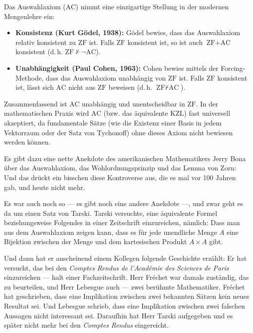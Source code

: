 \begin{didactic-insight}
Das Auswahlaxiom ($\text{AC}$) nimmt eine einzigartige Stellung in der modernen Mengenlehre ein:
\begin{itemize}
    \item \textbf{Konsistenz (Kurt Gödel, 1938):} Gödel bewies, dass das Auswahlaxiom relativ konsistent zu $\text{ZF}$ ist. Falls $\text{ZF}$ konsistent ist, so ist auch $\text{ZF} + \text{AC}$ konsistent (d.\,h. $\text{ZF} \not\vdash \neg\text{AC}$).
    \item \textbf{Unabhängigkeit (Paul Cohen, 1963):} Cohen bewies mittels der Forcing-Methode, dass das Auswahlaxiom unabhängig von $\text{ZF}$ ist. Falls $\text{ZF}$ konsistent ist, lässt sich $\text{AC}$ nicht aus $\text{ZF}$ beweisen (d.\,h. $\text{ZF} \not\vdash \text{AC}$).
\end{itemize}
Zusammenfassend ist $\text{AC}$ unabhängig und unentscheidbar in $\text{ZF}$. In der mathematischen Praxis wird $\text{AC}$ (bzw. das äquivalente $\text{KZL}$) fast universell akzeptiert, da fundamentale Sätze (wie die Existenz einer Basis in jedem Vektorraum oder der Satz von Tychonoff) ohne dieses Axiom nicht bewiesen werden können.
\end{didactic-insight}

\begin{spoken-clean}[01:22:06 - 01:25:26]
Es gibt dazu eine nette Anekdote des amerikanischen Mathematikers Jerry Bona über das Auswahlaxiom, das Wohlordnungsprinzip und das Lemma von Zorn:  Und das drückt ein bisschen diese Kontroverse aus, die es mal vor 100 Jahren gab, und heute nicht mehr.

Es war auch noch so --- es gibt noch eine andere Anekdote ---, und zwar geht es da um einen Satz von Tarski. Tarski versuchte, eine äquivalente Formel beziehungsweise Folgendes in einer Zeitschrift einzureichen, nämlich: Dass man aus dem Auswahlaxiom zeigen kann, dass es für jede unendliche Menge $A$ eine Bijektion zwischen der Menge und dem kartesischen Produkt $A \times A$ gibt.

Und dann hat er anscheinend einem Kollegen folgende Geschichte erzählt: Er hat versucht, das bei den \emph{Comptes Rendus de l'Académie des Sciences de Paris} einzureichen --- halt einer Fachzeitschrift. Herr Fréchet war damals zuständig, das zu beurteilen, und Herr Lebesgue auch --- zwei berühmte Mathematiker. Fréchet hat geschrieben, dass eine Implikation zwischen zwei bekannten Sätzen kein neues Resultat sei. Und Lebesgue schrieb, dass eine Implikation zwischen zwei falschen Aussagen nicht interessant sei. Daraufhin hat Herr Tarski aufgegeben und es später nicht mehr bei den \emph{Comptes Rendus} eingereicht.
\end{spoken-clean}

